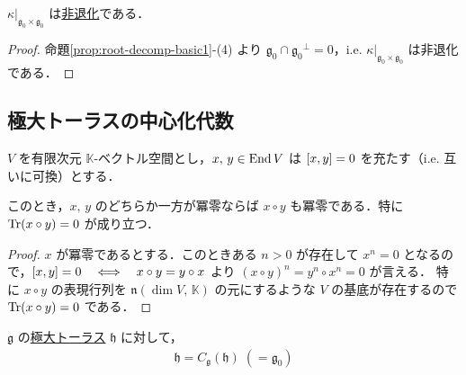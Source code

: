 \documentclass[rep_main]{subfiles}
\begin{document}
\begin{mycol}[label=col:c-Killing]{}
	$\kappa|_{\mathfrak{g}_0 \times \mathfrak{g}_0}$ は\hyperref[def:radical-bilinear]{非退化}である．
\end{mycol}

\begin{proof}
	命題\ref{prop:root-decomp-basic1}-(4) より $\mathfrak{g}_0 \cap \mathfrak{g}_0{}^\perp = 0$，i.e. $\kappa|_{\mathfrak{g}_0 \times \mathfrak{g}_0}$ は非退化である．
\end{proof}


\subsection{極大トーラスの中心化代数}

\begin{mylem}[label=lem:8-2]{}
	$V$ を有限次元 $\mathbb{K}$-ベクトル空間とし，$x,\, y \in \operatorname{End} V$ は $\comm{x}{y} = 0$ を充たす（i.e. 互いに可換）とする．

	このとき，$x,\, y$ のどちらか一方が冪零ならば $x \circ y$ も冪零である．特に $\Tr (x \circ y) = 0$ が成り立つ．
\end{mylem}

\begin{proof}
	$x$ が冪零であるとする．このときある $n > 0$ が存在して $x^n = 0$ となるので，$\comm{x}{y} = 0 \IFF x \circ y = y \circ x$ より $(x \circ y)^n = y^{n} \circ x^n = 0$ が言える．
	特に $x\circ y$ の表現行列を $\mathfrak{n}(\dim V,\, \mathbb{K})$ の元にするような $V$ の基底が存在するので $\Tr(x\circ y) = 0$ である．
\end{proof}


\begin{myprop}[label=prop:torus-centralize]{}
	$\mathfrak{g}$ の\hyperref[def:toral-subLieAlg]{極大トーラス} $\mathfrak{h}$ に対して，
	\begin{align}
		\mathfrak{h} = C_{\mathfrak{g}}(\mathfrak{h}) \; (= \mathfrak{g}_0)
	\end{align}
\end{myprop}
\end{document}
